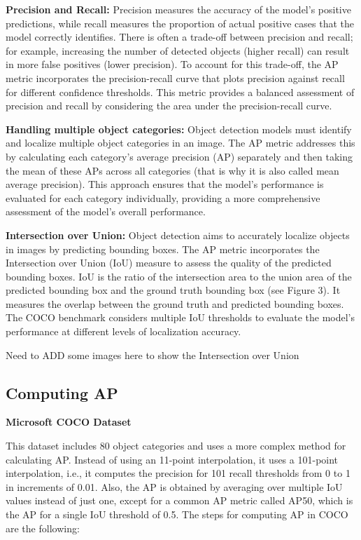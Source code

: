 \documentclass{article}
\begin{document}
\textbf{Precision and Recall:} Precision measures the accuracy of the model’s positive predictions, while recall measures the proportion of actual positive cases that the model correctly identifies. There is often a trade-off between precision and recall; for example, increasing the number of detected objects (higher recall) can result in more false positives (lower precision). To account for this trade-off, the AP metric incorporates the precision-recall curve that plots precision against recall for different confidence thresholds. This metric provides a balanced assessment of precision and recall by considering the area under the precision-recall curve.

\textbf{Handling multiple object categories:} Object detection models must identify and localize multiple object categories in an image. The AP metric addresses this by calculating each category’s average precision (AP) separately and then taking the mean of these APs across all categories (that is why it is also called mean average precision). This approach ensures that the model’s performance is evaluated for each category individually, providing a more comprehensive assessment of the model’s overall performance.

\textbf{Intersection over Union:} Object detection aims to accurately localize objects in images by predicting bounding boxes. The AP metric incorporates the Intersection over Union (IoU) measure to assess the quality of the predicted bounding boxes. IoU is the ratio of the intersection area to the union area of the predicted bounding box and the ground truth bounding box (see Figure 3). It measures the overlap between the ground truth and predicted bounding boxes. The COCO benchmark considers multiple IoU thresholds to evaluate the model’s performance at different levels of localization accuracy.


Need to ADD some images here to show the Intersection over Union


\subsection{Computing AP}


\textbf{Microsoft COCO Dataset}

This dataset includes 80 object categories and uses a more complex method for calculating AP. Instead of using an 11-point interpolation, it uses a 101-point interpolation, i.e., it computes the precision for 101 recall thresholds from 0 to 1 in increments of 0.01. Also, the AP is obtained by averaging over multiple IoU values instead of just one, except for a common AP metric called AP50, which is the AP for a single IoU threshold of 0.5. The steps for computing AP in COCO are the following:
\end{document}
